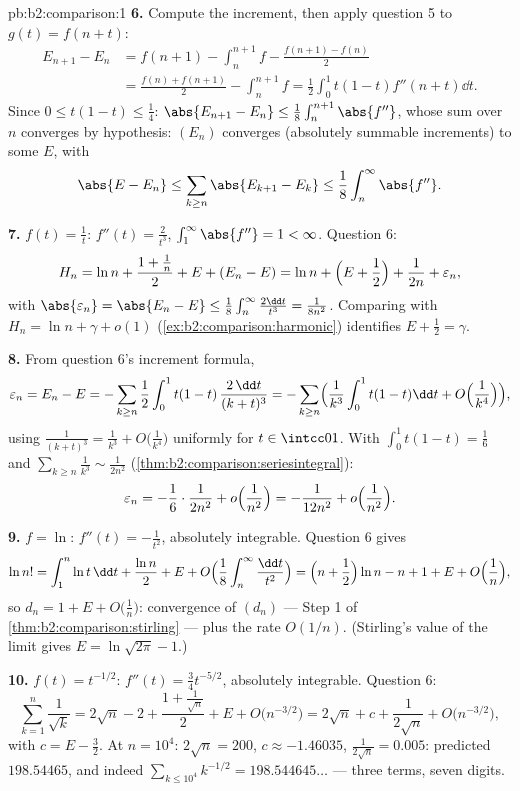 \begin{solution}{pb:b2:comparison:1}
\textbf{6.} Compute the increment, then apply question 5 to
$g(t) = f(n + t)$:
\begin{align*}
E_{n+1} - E_n
&= f(n{+}1) - \int_n^{n+1}\!f - \frac{f(n{+}1) - f(n)}2 \\
&= \frac{f(n) + f(n{+}1)}2 - \int_n^{n+1}\!f
= \frac12\int_0^1 t(1-t)f''(n+t)\dd t .
\end{align*}
Since $0 \leq t(1-t) \leq \frac14$: $\abs{E_{n+1} - E_n} \leq
\frac18\int_n^{n+1}\abs{f''}$, whose sum over $n$ converges by
hypothesis: $(E_n)$ converges (absolutely summable increments)
to some $E$, with
\[
\abs{E - E_n} \leq \sum_{k\geq n}\abs{E_{k+1} - E_k} \leq
\frac18\int_n^\infty\abs{f''} .
\]

\textbf{7.} $f(t) = \frac1t$: $f''(t) = \frac2{t^3}$,
$\int_1^\infty\abs{f''} = 1 < \infty$. Question 6:
\[
H_n = \ln n + \frac{1 + \frac1n}{2} + E + (E_n - E)
= \ln n + \Bigl(E + \frac12\Bigr) + \frac1{2n} +
\varepsilon_n,
\]
with $\abs{\varepsilon_n} = \abs{E_n - E} \leq
\frac18\int_n^\infty\frac{2\dd t}{t^3} = \frac1{8n^2}$.
Comparing with $H_n = \ln n + \gamma + o(1)$
(\cref{ex:b2:comparison:harmonic}) identifies $E + \frac12 =
\gamma$.

\textbf{8.} From question 6's increment formula,
\[
\varepsilon_n = E_n - E = -\sum_{k\geq n}\frac12\int_0^1
t(1-t)\,\frac{2\,\dd t}{(k+t)^3}
= -\sum_{k \geq n}\Bigl(\frac1{k^3}\int_0^1t(1-t)\dd t +
O\Bigl(\frac1{k^4}\Bigr)\Bigr),
\]
using $\frac{1}{(k+t)^3} = \frac1{k^3} +
O\bigl(\frac1{k^4}\bigr)$ uniformly for $t \in \intcc01$. With
$\int_0^1 t(1-t) = \frac16$ and
$\sum_{k\geq n}\frac1{k^3} \sim \frac{1}{2n^2}$
(\cref{thm:b2:comparison:seriesintegral}):
\[
\varepsilon_n = -\frac16\cdot\frac{1}{2n^2} +
o\Bigl(\frac1{n^2}\Bigr) = -\frac{1}{12n^2} +
o\Bigl(\frac{1}{n^2}\Bigr).
\]

\textbf{9.} $f = \ln$: $f''(t) = -\frac1{t^2}$, absolutely
integrable. Question 6 gives
\[
\ln n! = \int_1^n\ln t\,\dd t + \frac{\ln n}2 + E + O\Bigl(
\frac1{8}\int_n^\infty\frac{\dd t}{t^2}\Bigr)
= \Bigl(n + \frac12\Bigr)\ln n - n + 1 + E +
O\Bigl(\frac1n\Bigr),
\]
so $d_n = 1 + E + O\bigl(\frac1n\bigr)$: convergence of $(d_n)$
--- Step 1 of \cref{thm:b2:comparison:stirling} --- plus the
rate $O(1/n)$. (Stirling's value of the limit gives $E =
\ln\sqrt{2\pi} - 1$.)

\textbf{10.} $f(t) = t^{-1/2}$: $f''(t) = \frac34 t^{-5/2}$,
absolutely integrable. Question 6:
\[
\sum_{k=1}^n \frac1{\sqrt k}
= 2\sqrt n - 2 + \frac{1 + \frac1{\sqrt n}}2 + E +
O\bigl(n^{-3/2}\bigr)
= 2\sqrt n + c + \frac{1}{2\sqrt n} +
O\bigl(n^{-3/2}\bigr),
\]
with $c = E - \frac32$. At $n = 10^4$: $2\sqrt n = 200$, $c
\approx -1.46035$, $\frac1{2\sqrt n} = 0.005$: predicted
$198.54465$, and indeed $\sum_{k\leq10^4}k^{-1/2} =
198.544645\dots$ --- three terms, seven digits.


\end{solution}
